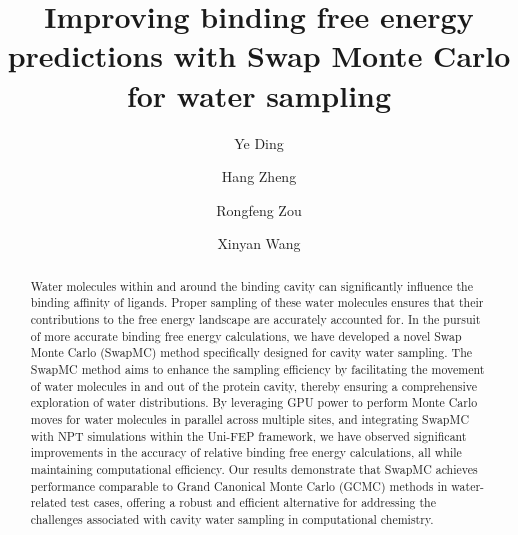 \documentclass[journal=jacsat,manuscript=article]{achemso}
\author{Ye Ding}
\affiliation{ATOMBEAT Inc.}
\author{Hang Zheng}
\affiliation{ATOMBEAT Inc.}
\author{Rongfeng Zou}
\affiliation{ATOMBEAT Inc.}
\author{Xinyan Wang}
\affiliation{ATOMBEAT Inc.}
\title[An \textsf{achemso} demo]
  {Improving binding free energy predictions with Swap Monte Carlo for water sampling}
\begin{document}






\begin{abstract}
Water molecules within and around the binding cavity can significantly influence the binding affinity of ligands. 
Proper sampling of these water molecules ensures that their contributions to the free energy landscape are accurately accounted for. 
In the pursuit of more accurate binding free energy calculations, we have developed a novel Swap Monte Carlo (SwapMC) method specifically designed for cavity water sampling. 
The SwapMC method aims to enhance the sampling efficiency by facilitating the movement of water molecules in and out of the protein cavity, thereby ensuring a comprehensive exploration of water distributions. 
By leveraging GPU power to perform Monte Carlo moves for water molecules in parallel across multiple sites, and integrating SwapMC with NPT simulations within the Uni-FEP framework, 
we have observed significant improvements in the accuracy of relative binding free energy calculations, all while maintaining computational efficiency. 
Our results demonstrate that SwapMC achieves performance comparable to Grand Canonical Monte Carlo (GCMC) methods in water-related test cases, offering a robust and efficient alternative for addressing the challenges associated with cavity water sampling in computational chemistry. 
\end{abstract}
\end{document}
